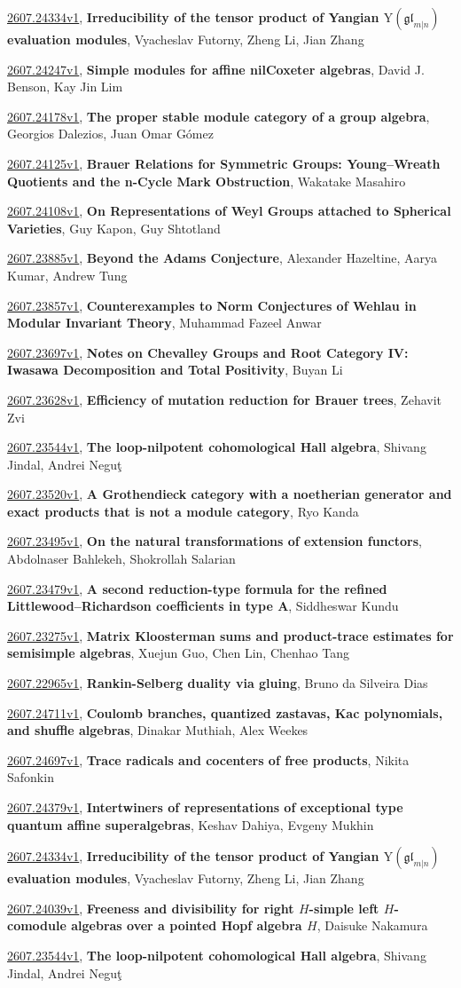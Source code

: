 \documentclass[9pt, a4paper]{article}
\theoremstyle{plain}
\theoremstyle{definition}
\theoremstyle{remark}
\newcommand{\arxiv}[3]{\href{https://arxiv.org/abs/#1}{#1}, \textbf{\textcolor{arxivblue}{#2}}, #3}
\begin{document}
\arxiv{2607.24334v1}{Irreducibility of the tensor product of Yangian \( \mathrm{Y}(\mathfrak{gl}_{m|n}) \) evaluation modules}{Vyacheslav Futorny, Zheng Li, Jian Zhang}

\arxiv{2607.24247v1}{Simple modules for affine nilCoxeter algebras}{David J. Benson, Kay Jin Lim}

\arxiv{2607.24178v1}{The proper stable module category of a group algebra}{Georgios Dalezios, Juan Omar Gómez}

\arxiv{2607.24125v1}{Brauer Relations for Symmetric Groups: Young--Wreath Quotients and the n-Cycle Mark Obstruction}{Wakatake Masahiro}

\arxiv{2607.24108v1}{On Representations of Weyl Groups attached to Spherical Varieties}{Guy Kapon, Guy Shtotland}

\arxiv{2607.23885v1}{Beyond the Adams Conjecture}{Alexander Hazeltine, Aarya Kumar, Andrew Tung}

\arxiv{2607.23857v1}{Counterexamples to Norm Conjectures of Wehlau in Modular Invariant Theory}{Muhammad Fazeel Anwar}

\arxiv{2607.23697v1}{Notes on Chevalley Groups and Root Category IV: Iwasawa Decomposition and Total Positivity}{Buyan Li}

\arxiv{2607.23628v1}{Efficiency of mutation reduction for Brauer trees}{Zehavit Zvi}

\arxiv{2607.23544v1}{The loop-nilpotent cohomological Hall algebra}{Shivang Jindal, Andrei Neguţ}

\arxiv{2607.23520v1}{A Grothendieck category with a noetherian generator and exact products that is not a module category}{Ryo Kanda}

\arxiv{2607.23495v1}{On the natural transformations of extension functors}{Abdolnaser Bahlekeh, Shokrollah Salarian}

\arxiv{2607.23479v1}{A second reduction-type formula for the refined Littlewood--Richardson coefficients in type A}{Siddheswar Kundu}

\arxiv{2607.23275v1}{Matrix Kloosterman sums and product-trace estimates for semisimple algebras}{Xuejun Guo, Chen Lin, Chenhao Tang}

\arxiv{2607.22965v1}{Rankin-Selberg duality via gluing}{Bruno da Silveira Dias}

\arxiv{2607.24711v1}{Coulomb branches, quantized zastavas, Kac polynomials, and shuffle algebras}{Dinakar Muthiah, Alex Weekes}

\arxiv{2607.24697v1}{Trace radicals and cocenters of free products}{Nikita Safonkin}

\arxiv{2607.24379v1}{Intertwiners of representations of exceptional type quantum affine superalgebras}{Keshav Dahiya, Evgeny Mukhin}

\arxiv{2607.24334v1}{Irreducibility of the tensor product of Yangian \( \mathrm{Y}(\mathfrak{gl}_{m|n}) \) evaluation modules}{Vyacheslav Futorny, Zheng Li, Jian Zhang}

\arxiv{2607.24039v1}{Freeness and divisibility for right $H$-simple left $H$-comodule algebras over a pointed Hopf algebra $H$}{Daisuke Nakamura}

\arxiv{2607.23544v1}{The loop-nilpotent cohomological Hall algebra}{Shivang Jindal, Andrei Neguţ}

\end{document}
